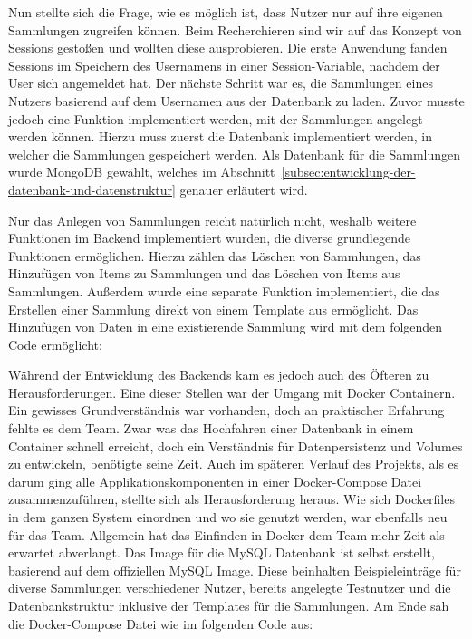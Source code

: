 \vspace{1em}

\vspace{1em}

Nun stellte sich die Frage, wie es möglich ist, dass Nutzer nur auf ihre eigenen Sammlungen zugreifen können.
Beim Recherchieren sind wir auf das Konzept von Sessions gestoßen und wollten diese ausprobieren.
Die erste Anwendung fanden Sessions im Speichern des Usernamens in einer Session-Variable, nachdem der User sich angemeldet hat.
Der nächste Schritt war es, die Sammlungen eines Nutzers basierend auf dem Usernamen aus der Datenbank zu laden.
Zuvor musste jedoch eine Funktion implementiert werden, mit der Sammlungen angelegt werden können.
Hierzu muss zuerst die Datenbank implementiert werden, in welcher die Sammlungen gespeichert werden.
Als Datenbank für die Sammlungen wurde MongoDB gewählt, welches im Abschnitt~\ref{subsec:entwicklung-der-datenbank-und-datenstruktur} genauer erläutert wird.

Nur das Anlegen von Sammlungen reicht natürlich nicht, weshalb weitere Funktionen im Backend implementiert wurden, die diverse grundlegende Funktionen ermöglichen.
Hierzu zählen das Löschen von Sammlungen, das Hinzufügen von Items zu Sammlungen und das Löschen von Items aus Sammlungen.
Außerdem wurde eine separate Funktion implementiert, die das Erstellen einer Sammlung direkt von einem Template aus ermöglicht.
Das Hinzufügen von Daten in eine existierende Sammlung wird mit dem folgenden Code ermöglicht:

\vspace{1em}

\vspace{1em}

Während der Entwicklung des Backends kam es jedoch auch des Öfteren zu Herausforderungen.
Eine dieser Stellen war der Umgang mit Docker Containern.
Ein gewisses Grundverständnis war vorhanden, doch an praktischer Erfahrung fehlte es dem Team.
Zwar was das Hochfahren einer Datenbank in einem Container schnell erreicht, doch ein Verständnis für Datenpersistenz und Volumes zu entwickeln, benötigte seine Zeit.
Auch im späteren Verlauf des Projekts, als es darum ging alle Applikationskomponenten in einer Docker-Compose Datei zusammenzuführen, stellte sich als Herausforderung heraus.
Wie sich Dockerfiles in dem ganzen System einordnen und wo sie genutzt werden, war ebenfalls neu für das Team.
Allgemein hat das Einfinden in Docker dem Team mehr Zeit als erwartet abverlangt.
Das Image für die MySQL Datenbank ist selbst erstellt, basierend auf dem offiziellen MySQL Image.
Diese beinhalten Beispieleinträge für diverse Sammlungen verschiedener Nutzer, bereits angelegte Testnutzer und die Datenbankstruktur inklusive der Templates für die Sammlungen.
Am Ende sah die Docker-Compose Datei wie im folgenden Code aus:

